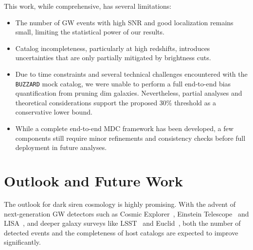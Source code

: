 This work, while comprehensive, has several limitations:
\vspace{-1em}
\begin{itemize}
    \item The number of \ac{GW} events with high \ac{SNR} and good localization remains small, limiting the statistical power of our results.
    \vspace{-1em}
    \item Catalog incompleteness, particularly at high redshifts, introduces uncertainties that are only partially mitigated by brightness cuts.
    \vspace{-1em}
    \item Due to time constraints and several technical challenges encountered with the \texttt{BUZZARD} mock catalog, we were unable to perform a full end-to-end bias quantification from pruning dim galaxies. Nevertheless, partial analyses and theoretical considerations support the proposed 30\% threshold as a conservative lower bound.
    \vspace{-1em}
    \item While a complete end-to-end \acf{MDC} framework has been developed, a few components still require minor refinements and consistency checks before full deployment in future analyses.
\end{itemize}

\section{Outlook and Future Work}

The outlook for dark siren cosmology is highly promising. With the advent of next-generation \ac{GW} detectors such as Cosmic Explorer~\citep{Evans:CE}, Einstein Telescope~\citep{Abac:ET} and LISA~\citep{LISA:2024hlh}, and deeper galaxy surveys like LSST~\citep{ivezic2019lsst} and Euclid~\citep{mellier2024euclid}, both the number of detected events and the completeness of host catalogs are expected to improve significantly.

